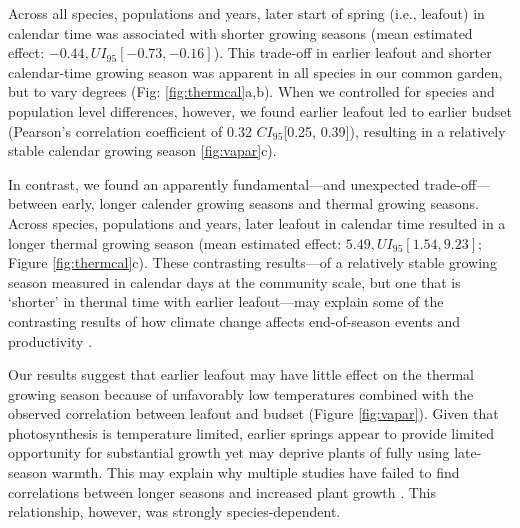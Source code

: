 \documentclass{article}[12pt]
\begin{document}
Across all species, populations and years, later start of spring (i.e., leafout) in calendar time was associated with shorter growing seasons (mean estimated effect: $-0.44, UI_{95}[-0.73, -0.16]$). This trade-off in earlier leafout and shorter calendar-time growing season was apparent in all species in our common garden, but to vary degrees (Fig: \ref{fig:thermcal}a,b). When we controlled for species and population level differences, however, we found earlier leafout led to earlier budset (Pearson's correlation coefficient of 0.32 $CI_{95}$[0.25, 0.39]), resulting in a relatively stable calendar growing season \ref{fig:vapar}c). %

In contrast, we found an apparently fundamental---and unexpected trade-off---between early, longer calender growing seasons and thermal growing seasons. Across species, populations and years, later leafout in calendar time resulted in a longer thermal growing season (mean estimated effect: $5.49, UI_{95}[1.54, 9.23]$; Figure \ref{fig:thermcal}c). These contrasting results---of a relatively stable growing season measured in calendar days at the community scale, but one that is `shorter' in thermal time with earlier leafout---may explain some of the contrasting results of how climate change affects end-of-season events and productivity \citep{Zani2020}. %

Our results suggest that earlier leafout may have little effect on the thermal growing season because of unfavorably low temperatures combined with the observed correlation between leafout and budset (Figure \ref{fig:vapar}). Given that photosynthesis is temperature limited, earlier springs appear to provide limited opportunity for substantial growth yet may deprive plants of fully using late-season warmth. This may explain why multiple studies have failed to find correlations between longer seasons and increased plant growth \citep{cufar2015variations,camarero2022decoupled,dow2022warm,silvestro2023longer}. %
This relationship, however, was strongly species-dependent. 
\end{document}

